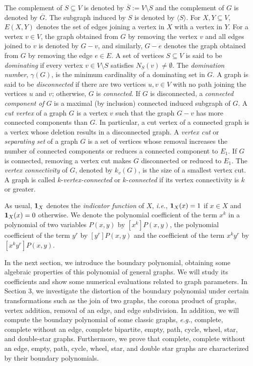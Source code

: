 \documentclass[review]{elsarticle}
\newcommand{\g}{\gamma}
\begin{document}
The complement of $S\subseteq V$ is
denoted by $\overline{S}:=V\setminus S$ and the complement of $G$ is denoted by $\overline{G}$.
The subgraph induced by $S$ is denoted by $\langle S\rangle$. 
For $X,Y\subseteq V$, $E(X,Y)$ denotes the set of edges joining a vertex in $X$ with a vertex in $Y$.
For a vertex $v\in V$, the graph obtained from $G$ by removing the vertex $v$ and all edges joined to $v$ is denoted by $G-v$, and similarly, $G-e$ denotes the graph obtained from $G$ by removing the edge $e\in E$. 
A set of vertices $S\subseteq V$ is said to be \emph{dominating} if every vertex $v\in V\setminus S$ satisfies $N_{S}(v)\neq\emptyset$. The \emph{domination number}, $\g(G)$, is the minimum cardinality of a dominating set in $G$. 
A graph is said to be \emph{disconnected} if there are two vertices $u,v\in V$ with no path joining the vertices $u$ and $v$; otherwise, $G$ is \emph{connected}. If $G$ is disconnected, a \emph{connected component of} $G$ is a maximal (by inclusion) connected induced subgraph of $G$. 
A \emph{cut vertex} of a graph $G$ is a vertex $v$ such that the graph $G-v$ has more connected components than $G$. In particular, a cut vertex of a connected graph is a vertex whose deletion results in a disconnected graph.
A \emph{vertex cut} or \emph{separating set} of a graph $G$ is a set of vertices whose removal increases the number of connected components or reduces a connected component to $E_1$. If $G$ is connected, removing a vertex cut makes $G$ disconnected or reduced to $E_1$. The \emph{vertex connectivity} of $G$, denoted by $k_v(G)$, is the size of a smallest vertex cut. A graph is called $k$-\emph{vertex-connected} or $k$-\emph{connected} if its vertex connectivity is $k$ or greater. 


As usual, ${\bf 1}_X$ denotes the \emph{indicator function} of $X$, \emph{i.e.}, ${\bf 1}_X(x)=1$ if $x\in X$ and ${\bf 1}_X(x)=0$ otherwise. 
We denote the polynomial coefficient of the term $x^k$ in a polynomial of two variables $P(x,y)$ by $[x^k]P(x,y)$, the polynomial coefficient of the term $y^r$ by $[y^r]P(x,y)$ and the coefficient of the term $x^ky^r$ by $[x^ky^r]P(x,y)$. 



In the next section, we introduce the boundary polynomial, obtaining some algebraic properties of this polynomial of general graphs. We will study its coefficients and show some numerical evaluations related to graph parameters.
In Section 3, we investigate the distortion of the boundary polynomial under certain transformations such as the join of two graphs, the corona product of graphs, vertex addition, removal of an edge, and edge subdivision. In addition, we will compute the boundary polynomial of some classic graphs, \emph{e.g.}, complete, complete without an edge, complete bipartite, empty, path, cycle, wheel, star, and double-star graphs. 
Furthermore, we prove that complete, complete without an edge, empty, path, cycle, wheel, star, and double star graphs are characterized by their boundary polynomials.
\end{document}
